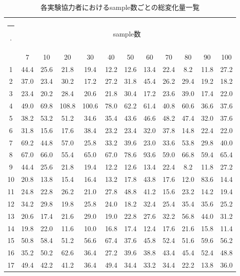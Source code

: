 \documentclass{ltjsreport}
\makeatletter
\def\Hline{
  \noalign{\ifnum0=`}\fi\hrule \@height 3.\arrayrulewidth \futurelet
  \reserved@a\@xhline}
\makeatother
\begin{document}
		\begin{table}[H]
		\begin{center}
		\caption{各実験協力者におけるsample数ごとの総変化量一覧}
		\label{tab:FVRdata}
		\begin{tabular}{c|ccccccccccc} \Hline
			\multirow{2}{*}{Person}&\multicolumn{11}{c}{sample数}\\
			& 7 & 10 & 20 & 30 & 40 & 50 & 60 & 70 & 80 & 90 & 100 \\ \hline
			1 & 44.4 & 25.6 & 21.8 & 19.4 & 12.2 & 12.6 & 13.4 & 22.4 & 8.2 & 11.8 & 27.2 \\
			2 & 37.0 & 23.4 & 30.2 & 17.2 & 27.2 & 31.8 & 45.4 & 26.2 & 29.4 & 19.2 & 18.2 \\
			3 & 23.4 & 20.2 & 28.4 & 20.6 & 21.8 & 30.4 & 17.2 & 23.6 & 39.0 & 17.4 & 22.0 \\
			4 & 49.0 & 69.8 & 108.8 & 100.6 & 78.0 & 62.2 & 61.4 & 40.8 & 60.6 & 36.6 & 37.6 \\
			5 & 38.2 & 53.2 & 51.2 & 34.6 & 35.4 & 43.6 & 46.6 & 48.2 & 47.4 & 32.0 & 37.6 \\
			6 & 31.8 & 15.6 & 17.6 & 38.4 & 23.2 & 23.4 & 32.0 & 37.8 & 14.8 & 22.4 & 22.0 \\
			7 & 69.2 & 44.8 & 57.0 & 25.8 & 33.2 & 39.6 & 23.0 & 33.6 & 53.8 & 29.8 & 40.0 \\
			8 & 67.0 & 66.0 & 55.4 & 65.0 & 67.0 & 78.6 & 93.6 & 59.0 & 66.8 & 59.4 & 65.4 \\
			9 & 44.4 & 25.6 & 21.8 & 19.4 & 12.2 & 12.6 & 13.4 & 22.4 & 8.2 & 11.8 & 27.2 \\
			10 & 20.8 & 13.8 & 15.4 & 16.4 & 13.2 & 17.8 & 43.8 & 17.6 & 12.0 & 83.6 & 14.4 \\
			11 & 24.8 & 22.8 & 26.2 & 21.0 & 27.8 & 48.8 & 41.2 & 15.6 & 23.2 & 14.2 & 19.4 \\
			12 & 34.2 & 29.8 & 19.8 & 25.8 & 24.0 & 18.2 & 32.4 & 25.4 & 35.4 & 35.6 & 25.2 \\
			13 & 20.6 & 17.4 & 21.6 & 29.0 & 19.0 & 22.8 & 27.6 & 32.2 & 56.8 & 44.0 & 31.2 \\
			14 & 19.8 & 22.0 & 11.6 & 10.0 & 16.8 & 17.4 & 12.4 & 17.6 & 21.6 & 15.8 & 11.4 \\
			15 & 50.8 & 58.4 & 51.2 & 56.6 & 67.4 & 37.6 & 45.8 & 52.4 & 51.6 & 59.6 & 56.2 \\
			16 & 35.2 & 50.2 & 62.6 & 36.4 & 27.2 & 39.6 & 38.8 & 43.4 & 45.4 & 52.4 & 48.8 \\
			17 & 49.4 & 42.2 & 41.2 & 36.4 & 49.4 & 34.4 & 33.2 & 34.4 & 22.2 & 13.8 & 36.0 \\

\end{tabular}
\end{center}
\end{table}
\end{document}
